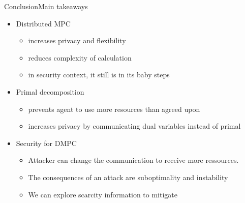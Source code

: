 \documentclass[aspectratio=169]{beamer}
\begin{document}
\begin{frame}{Conclusion}{Main takeaways}
  \begin{itemize}[<+(1)->]
    \item Distributed MPC
          \begin{itemize}
            \item increases privacy and flexibility
            \item reduces complexity of calculation
            \item in security context, it still is in its baby steps
          \end{itemize}
    \item Primal decomposition
          \begin{itemize}
            \item prevents agent to use more resources than agreed upon
            \item increases privacy by communicating dual variables instead of primal
          \end{itemize}
    \item Security for DMPC
          \begin{itemize}
            \item Attacker can change the communication to receive more ressources.
            \item The consequences of an attack are suboptimality and instability
            \item We can explore scarcity information to mitigate
          \end{itemize}
  \end{itemize}
\end{frame}


\end{document}
